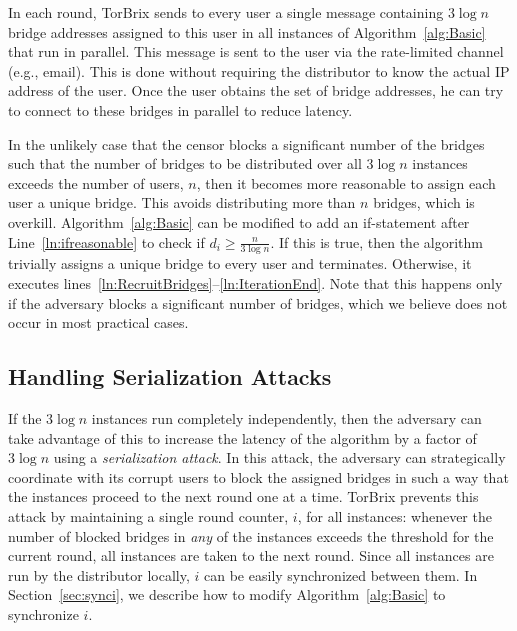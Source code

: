 \documentclass[letterpaper,twocolumn,10pt]{article}
\newcommand{\fullpaper}[1]{#1}
\newcommand{\fullpaper}[1]{}
\newcommand{\sfsize}{\fontsize{0.73\baselineskip}{0.73\baselineskip}\selectfont}
\newcommand{\sans}[1]{\textsf{\sfsize \mbox{#1}}}
\newcommand{\brix}{\sans{TorBrix}\xspace}
\begin{document}
In each round, \brix sends to every user a single message containing $3\log{n}$ bridge addresses assigned to this user in all  instances of Algorithm~\ref{alg:Basic} that run in parallel. This message is sent to the user via the rate-limited channel (e.g., email). \fullpaper{This is done without requiring the distributor to know the actual IP address of the user. Once the user obtains the set of bridge addresses, he can try to connect to these bridges in parallel to reduce latency.}

In the unlikely case that the censor blocks a significant number of the bridges such that the number of bridges to be distributed over all $3\log{n}$ instances exceeds the number of users, $n$, then it becomes more reasonable to assign each user a unique bridge. This avoids distributing more than $n$ bridges, which is overkill. 
Algorithm~\ref{alg:Basic} can be modified to add an if-statement after Line~\ref{ln:ifreasonable} to check if ${d_i \geq \frac{n}{3\log{n}}}$. If this is true, then the algorithm trivially assigns a unique bridge to every user and terminates. Otherwise, it executes lines~\ref{ln:RecruitBridges}--\ref{ln:IterationEnd}.
Note that this happens only if the adversary blocks a significant number of bridges, which we believe does not occur in most practical cases. %

\subsection{Handling Serialization Attacks}
If the $3\log{n}$ instances run completely independently, then the adversary can take advantage of this to increase the latency of the algorithm by a factor of $3\log{n}$ using a \emph{serialization attack}. In this attack, the adversary can strategically coordinate with its corrupt users to block the assigned bridges in such a way that the instances proceed to the next round one at a time. 
\brix prevents this attack by maintaining a single round counter, $i$, for all instances: whenever the number of blocked bridges in \emph{any} of the instances exceeds the threshold for the current round, all instances are taken to the next round. Since all instances are run by the distributor locally, $i$ can be easily synchronized between them. In Section~\ref{sec:synci}, we describe how to modify Algorithm~\ref{alg:Basic} to synchronize $i$.
\end{document}

